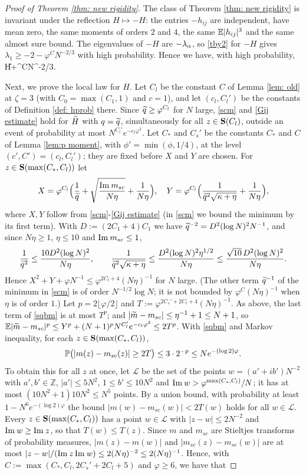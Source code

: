 \begin{proof}[Proof of Theorem \ref{thm: new rigidity}]
The class of Theorem \ref{thm: new rigidity} is invariant under the reflection $H\mapsto-H$: the entries $-h_{ij}$ are independent, have mean zero, the same moments of orders $2$ and $4$, the same $\mathbb{E}|h_{ij}|^3$ and the same almost sure bound. The eigenvalues of $-H$ are $-\lambda_\alpha$, so \eqref{tby2} for $-H$ gives $\lambda_1\ge-2-\varphi^{C}N^{-2/3}$ with high probability. Hence we have, with high probability,
\be\label{tby3}
\|H\|+\varphi^{C}N^{-2/3}.
\ee

Next, we prove the local law for $H$. Let $C_l$ be the constant $C$ of Lemma \ref{lem: old} at $\zeta=3$ (with $C_0=\max(C_1,1)$ and $c=1$), and let $(c_l,C_l')$ be the constants of Definition \ref{def: hprob} there. Since $\widetilde q\ge\varphi^{C_l}$ for $N$ large, \eqref{scm} and \eqref{Gij estimate} hold for $\widetilde H$ with $q=\widetilde q$, simultaneously for all $z\in{\bf S}(C_l)$, outside an event of probability at most $N^{C_l'}e^{-c_l\varphi^3}$. Let $C_*$ and $C_s'$ be the constants $C_*$ and $C$ of Lemma \ref{lem:p moment}, with $\phi'=\min(\phi,1/4)$, at the level $(c',C')=(c_l,C_l')$; they are fixed before $X$ and $Y$ are chosen. For $z\in{\bf S}(\max(C_*,C_l))$ let
$$
X= \varphi^{C_l} \Big(\frac1{\widetilde q}+\sqrt{\frac{\mathrm{Im}\: m_{sc}}{N\eta}}+\frac{1}{  N \eta}\Big), \quad Y=\varphi^{C_l}\Big(\frac{1}{\widetilde q^{2}\sqrt{\kappa+\eta}}+\frac{1}{  N \eta}\Big),
$$
where $X, Y$ follow from \eqref{scm}-\eqref{Gij estimate} (in \eqref{scm} we bound the minimum by its first term). With $D:=(2C_1+4)C_1$ we have $\widetilde q^{-2}=D^2(\log N)^2N^{-1}$, and since $N\eta\ge1$, $\eta\le10$ and $\mathrm{Im}\: m_{sc}\le1$,
$$
\frac{1}{\widetilde q^2}\le\frac{10D^2(\log N)^2}{N\eta},\qquad \frac{1}{\widetilde q^{2}\sqrt{\kappa+\eta}}\le\frac{D^2(\log N)^2\eta^{1/2}}{N\eta}\le\frac{\sqrt{10}\,D^2(\log N)^2}{N\eta}.
$$
Hence $X^2+Y+\varphi N^{-1}\le\varphi^{2C_l+4}(N\eta)^{-1}$ for $N$ large. (The other term $\widetilde q^{-1}$ of the minimum in \eqref{scm} is of order $N^{-1/2}\log N$; it is not bounded by $\varphi^C(N\eta)^{-1}$ when $\eta$ is of order $1$.) Let $p=2\lfloor\varphi/2\rfloor$ and $T:=\varphi^{2C_s'+2C_l+4}(N\eta)^{-1}$. As above, the last term of \eqref{sqbm} is at most $T^p$; and $|\widetilde m-m_{sc}|\le\eta^{-1}+1\le N+1$, so $\mathbb{E}|\widetilde m-m_{sc}|^p\le Y^p+(N+1)^pN^{C_l'}e^{-c_l\varphi^3}\le2T^p$. With \eqref{sqbm} and Markov inequality, for each $z\in{\bf S}(\max(C_*,C_l))$,
$$
\mathbb{P}\big(|m(z)-m_{sc}(z)|\ge2T\big)\le3\cdot2^{-p}\le Ne^{-(\log2)\varphi}.
$$
To obtain this for all $z$ at once, let $\mathcal L$ be the set of the points $w=(a'+ib')N^{-2}$ with $a',b'\in\mathbb Z$, $|a'|\le5N^2$, $1\le b'\le10N^2$ and $\mathrm{Im}\: w>\varphi^{\max(C_*,C_l)}/N$; it has at most $(10N^2+1)10N^2\le N^5$ points. By a union bound, with probability at least $1-N^6e^{-(\log2)\varphi}$ the bound $|m(w)-m_{sc}(w)|<2T(w)$ holds for all $w\in\mathcal L$. Every $z\in{\bf S}(\max(C_*,C_l))$ has a point $w\in\mathcal L$ with $|z-w|\le2N^{-2}$ and $\mathrm{Im}\: w\ge\mathrm{Im}\: z$, so that $T(w)\le T(z)$. Since $m$ and $m_{sc}$ are Stieltjes transforms of probability measures, $|m(z)-m(w)|$ and $|m_{sc}(z)-m_{sc}(w)|$ are at most $|z-w|/(\mathrm{Im}\: z\,\mathrm{Im}\: w)\le2(N\eta)^{-2}\le2(N\eta)^{-1}$. Hence, with $C:=\max(C_*,C_l,2C_s'+2C_l+5)$ and $\varphi\ge6$, we have that

\end{proof}
